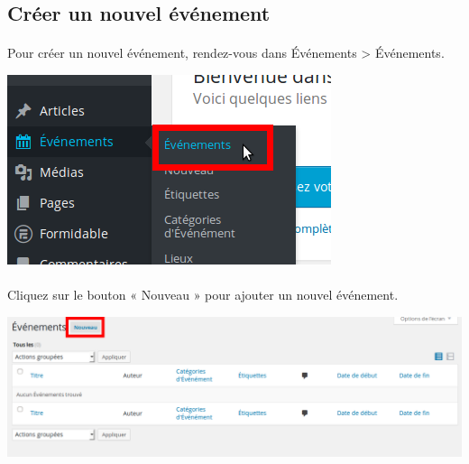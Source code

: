 \documentclass[10pt,a4paper]{article}
\begin{document}
\subsection{Créer un nouvel événement}
\paragraph{}Pour créer un nouvel événement, rendez-vous dans Événements > Événements.
\begin{center}
\includegraphics[scale=0.3]{img/0196.png}
\end{center}
\paragraph{}Cliquez sur le bouton « Nouveau » pour ajouter un nouvel événement.
\begin{center}
\includegraphics[scale=0.3]{img/0197.png}
\end{center}
\newpage
\end{document}
